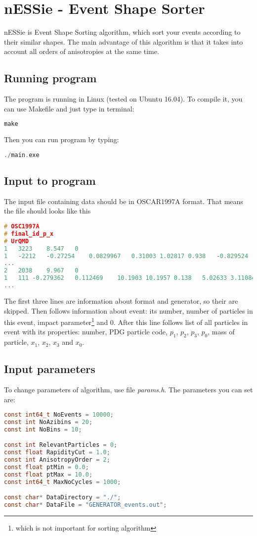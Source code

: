 \documentclass[a4paper]{article}
\begin{document}
\section*{nESSie - Event Shape Sorter}
nESSie is Event Shape Sorting algorithm, which sort your events according to their similar shapes. The main advantage of this algorithm is that it takes into account all orders of anisotropies at the same time.

\subsection*{Running program}
The program is running in Linux (tested on Ubuntu 16.04). To compile it, you can use Makefile and just type in terminal:
\begin{lstlisting}[language=c]
make
\end{lstlisting}

Then you can run program by typing:
\begin{lstlisting}[language=c]
./main.exe
\end{lstlisting}

\subsection*{Input to program}
The input file containing data should be in OSCAR1997A format. That means the file should looks like this
\begin{lstlisting}[language=c]
# OSC1997A
# final_id_p_x
# UrQMD
1 	3223	8.547	0
1	-2212	-0.27254	0.0829967	0.31003	1.02817	0.938	-0.829524	5.68779	10.2909	32.7802
...
2	2038	9.967	0
1	111	-0.279362	0.112469	10.1903	10.1957	0.138	5.02633	3.11084	199.578	200
...
\end{lstlisting}

The first three lines are information about format and generator, so their are skipped. Then follows information about event: its number, number of particles in this event, impact parameter\footnote{which is not important for sorting algorithm} and $0$.
After this line follows list of all particles in event with its properties: number, PDG particle code, $p_1$, $p_2$, $p_3$, $p_0$, mass of particle, $x_1$, $x_2$, $x_3$ and $x_0$.

\subsection*{Input parameters}

To change parameters of algorithm, use file \textit{params.h}. The parameters you can set are:
\begin{lstlisting}[language=c]
const int64_t NoEvents = 10000;
const int NoAzibins = 20;
const int NoBins = 10;

const int RelevantParticles = 0;
const float RapidityCut = 1.0;
const int AnisotropyOrder = 2;
const float ptMin = 0.0;
const float ptMax = 10.0;
const int64_t MaxNoCycles = 1000;

const char* DataDirectory = "./";
const char* DataFile = "GENERATOR_events.out";
\end{lstlisting}
\end{document}
